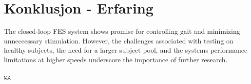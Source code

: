 
\section{Konklusjon - Erfaring}


The closed-loop FES system shows promise for controlling gait and minimizing unneccessary stimulation. However, the challenges associated with testing on healthy subjects, the need for a larger subject pool, and the systems performance limitations at higher speeds underscore the importance of further research. 

gg

